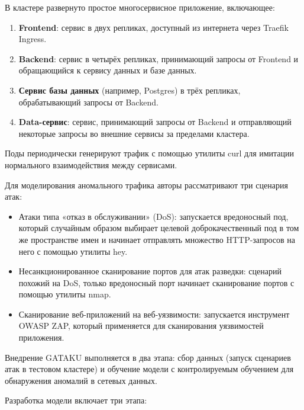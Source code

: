 В кластере развернуто простое многосервисное приложение, включающее:

\begin{enumerate}
    \item \textbf{Frontend}: сервис в двух репликах, доступный из интернета через Traefik Ingress.
    \item \textbf{Backend}: сервис в четырёх репликах, принимающий запросы от Frontend и обращающийся к сервису данных и базе данных.
    \item \textbf{Сервис базы данных} (например, Postgres) в трёх репликах, обрабатывающий запросы от Backend.
    \item \textbf{Data-сервис}: сервис, принимающий запросы от Backend и отправляющий некоторые запросы во внешние сервисы за пределами кластера.
\end{enumerate}

Поды периодически генерируют трафик с помощью утилиты curl для имитации нормального взаимодействия между сервисами.

Для моделирования аномального трафика авторы рассматривают три сценария атак:

\begin{itemize}
    \item Атаки типа «отказ в обслуживании» (DoS): запускается вредоносный под, который случайным образом выбирает целевой доброкачественный под в том же пространстве имен и начинает отправлять множество HTTP-запросов на него с помощью утилиты hey.
    \item Несанкционированное сканирование портов для атак разведки: сценарий похожий на DoS, только вредоносный порт начинает сканирование портов с помощью утилиты nmap.
    \item Сканирование веб-приложений на веб-уязвимости: запускается инструмент OWASP ZAP, который применяется для сканирования уязвимостей приложения.
\end{itemize}

Внедрение GATAKU выполняется в два этапа: сбор данных (запуск сценариев атак в тестовом кластере) и обучение модели с контролируемым обучением для обнаружения аномалий в сетевых данных.

Разработка модели включает три этапа:


